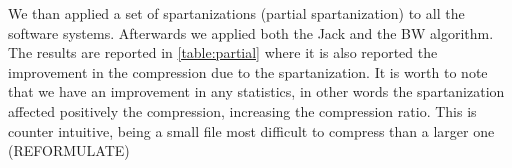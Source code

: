 \begin{table}
  \label{table:original}
  \caption{The results of the compression using the Jack algorithm alone and both Jack and
  Burroughs-Wheeler algorithms combined}
  \centering
\end{table}

We than applied a set of spartanizations (partial spartanization) to all the
software systems. Afterwards we applied both the Jack and the BW algorithm.
The results are reported in \cref{table:partial} where it is also
reported the improvement in the compression due to the spartanization. It is
worth to note that we have an improvement in any statistics, in other words the
spartanization affected positively the compression, increasing the compression
ratio. This is counter intuitive, being a small file most difficult to
compress than a larger one (REFORMULATE)

